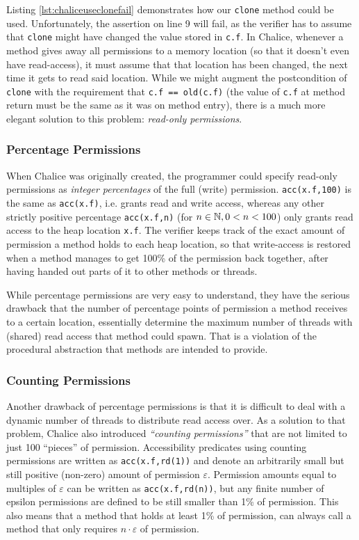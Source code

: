 Listing \ref{lst:chaliceuseclonefail} demonstrates how our \lstinline!clone! method could be used. 
Unfortunately, the assertion on line 9 will fail, as the verifier has to assume that \lstinline!clone! might have changed the value stored in \lstinline!c.f!.
In Chalice, whenever a method gives away all permissions to a memory location (so that it doesn't even have read-access), it must assume that that location has been changed, the next time it gets to read said location.
While we might augment the postcondition of \lstinline!clone! with the requirement that \lstinline!c.f == old(c.f)! (the value of \lstinline!c.f! at method return must be the same as it was on method entry), there is a much more elegant solution to this problem: \emph{read-only permissions}.

\subsubsection{Percentage Permissions}
When Chalice was originally created, the programmer could specify read-only permissions as \emph{integer percentages} of the full (write) permission. 
\lstinline!acc(x.f,100)! is the same as \lstinline!acc(x.f)!, i.e. grants read and write access, whereas any other strictly positive percentage \lstinline!acc(x.f,n)! (for $n\in\mathbb{N}, 0 < n < 100$) only grants read access to the heap location \lstinline!x.f!.
The verifier keeps track of the exact amount of permission a method holds to each heap location, so that write-access is restored when a method manages to get 100\% of the permission back together, after having handed out parts of it to other methods or threads.

While percentage permissions are very easy to understand, they have the serious drawback that the number of percentage points of permission a method receives to a certain location, essentially determine the maximum number of threads with (shared) read access that method could spawn.
That is a violation of the procedural abstraction that methods are intended to provide.

\subsubsection{Counting Permissions}\label{sct:counting-permissions}
Another drawback of percentage permissions is that it is difficult to deal with a dynamic number of threads to distribute read access over.
As a solution to that problem, Chalice also introduced \emph{``counting permissions''} that are not limited to just 100 ``pieces'' of permission.
Accessibility predicates using counting permissions are written as \lstinline!acc(x.f,rd(1))! and denote an arbitrarily small but still positive (non-zero) amount of permission $\varepsilon$. 
Permission amounts equal to multiples of $\varepsilon$ can be written as \lstinline!acc(x.f,rd(n))!, but any finite number of epsilon permissions are defined to be still smaller than 1\% of permission.
This also means that a method that holds at least 1\% of permission, can always call a method that only requires $n\cdot{}\varepsilon$ of permission.

